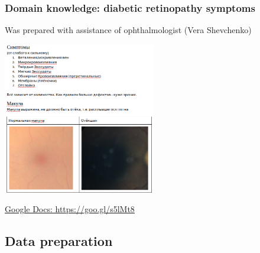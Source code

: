 \documentclass{beamer}
\begin{document}
\begin{frame}\frametitle{Domain knowledge: diabetic retinopathy symptoms}

\small Was prepared with assistance of ophthalmologist (Vera Shevchenko)

\begin{center}
\par \includegraphics[interpolate=true,valign=c,width=0.5\textwidth]{pics/symptoms_pic.png}
\vspace{5pt}
\par \hyperlink{https://goo.gl/s5lMt8}{Google Docs: https://goo.gl/s5lMt8}
\end{center}

\end{frame}

\subsection{Data preparation}
\end{document}

